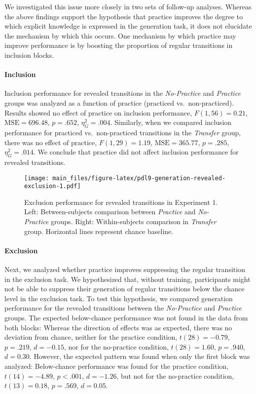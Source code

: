 \documentclass[man]{apa6}
\theoremstyle{definition}
\theoremstyle{definition}
\theoremstyle{definition}
\theoremstyle{remark}
\begin{document}
We investigated this issue more closely in two sets of follow-up
analyses. Whereas the above findings support the hypothesis that
practice improves the degree to which explicit knowledge is expressed in
the generation task, it does not elucidate the mechanism by which this
occurs. One mechanism by which practice may improve performance is by
boosting the proportion of regular transitions in inclusion blocks.

\paragraph{Inclusion}\label{inclusion-1}

Inclusion performance for revealed transitions in the \emph{No-Practice}
and \emph{Practice} groups was analyzed as a function of practice
(practiced vs.~non-practiced). Results showed no effect of practice on
inclusion performance, \(F(1, 56) = 0.21\), \(\mathrm{MSE} = 696.48\),
\(p = .652\), \(\eta^2_G = .004\). Similarly, when we compared inclusion
performance for practiced vs.~non-practiced transitions in the
\emph{Transfer} group, there was no effect of practice,
\(F(1, 29) = 1.19\), \(\mathrm{MSE} = 365.77\), \(p = .285\),
\(\eta^2_G = .014\). We conclude that practice did not affect inclusion
performance for revealed transitions.

\begin{figure}[htbp]
\centering
\texttt{[image: main\_files/figure-latex/pdl9-generation-revealed-exclusion-1.pdf]}
\caption{\label{fig:pdl9-generation-revealed-exclusion}Exclusion performance
for revealed transitions in Experiment 1. Left: Between-subjects
comparison between \emph{Practice} and \emph{No-Practice} groups. Right:
Within-subjects comparison in \emph{Transfer} group. Horizontal lines
represent chance baseline.}
\end{figure}

\paragraph{Exclusion}\label{exclusion-1}

Next, we analyzed whether practice improves suppressing the regular
transition in the exclusion task. We hypothesized that, without
training, participants might not be able to suppress their generation of
regular transitions below the chance level in the exclusion task. To
test this hypothesis, we compared generation performance for the
revealed transitions between the \emph{No-Practice} and \emph{Practice}
groups. The expected below-chance performance was not found in the data
from both blocks: Whereas the direction of effects was as expected,
there was no deviation from chance, neither for the practice condition,
\(t(28) = -0.79\), \(p = .219\), \(d = -0.15\), nor for the no-practice
condition, \(t(28) = 1.60\), \(p = .940\), \(d = 0.30\). However, the
expected pattern was found when only the first block was analyzed:
Below-chance performance was found for the practice condition,
\(t(14) = -4.89\), \(p < .001\), \(d = -1.26\), but not for the
no-practice condition, \(t(13) = 0.18\), \(p = .569\), \(d = 0.05\).
\end{document}
